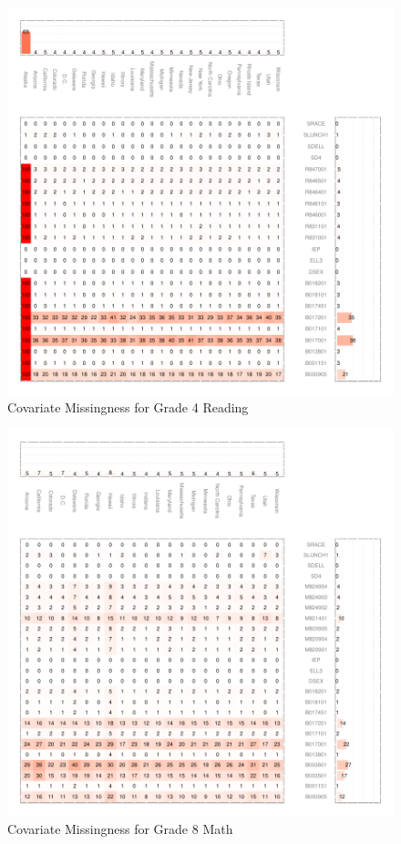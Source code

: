 \documentclass[letterpaper,12p,twoside]{article} %
\begin{document}
{\begin{figure}[h]
\begin{center}
\includegraphics[width=\textwidth]{../Figures2009/g4read-missing.pdf}
\caption{Covariate Missingness for Grade 4 Reading}
\label{fig:g4reading:missing}
\end{center}
\end{figure}

\begin{figure}[h]
\begin{center}
\includegraphics[width=\textwidth]{../Figures2009/g8math-missing.pdf}
\caption{Covariate Missingness for Grade 8 Math}
\label{fig:g8math:missing}
\end{center}
\end{figure}

}
\end{document}
